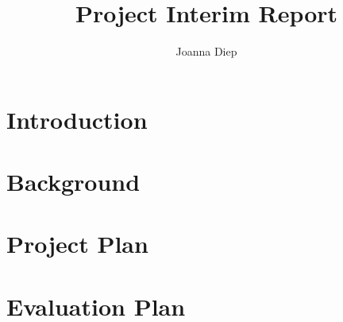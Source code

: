 \documentclass[a4paper]{article}
\title{Project Interim Report}
\author{Joanna Diep}
\begin{document}
\maketitle

\section{Introduction}

\section{Background}

\section{Project Plan}

\section{Evaluation Plan}
\end{document}
